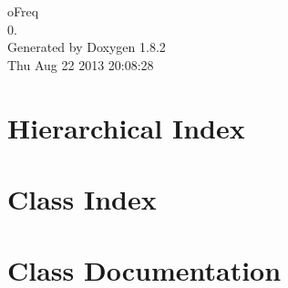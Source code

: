 \documentclass{book}
\begin{document}
\hypersetup{pageanchor=false,citecolor=blue}
\begin{titlepage}
\vspace*{7cm}
\begin{center}
{\Large o\-Freq \\[1ex]\large 0. }\\
\vspace*{1cm}
{\large Generated by Doxygen 1.8.2}\\
\vspace*{0.5cm}
{\small Thu Aug 22 2013 20:08:28}\\
\end{center}
\end{titlepage}
\clearemptydoublepage
{}
\tableofcontents
\clearemptydoublepage
{}
\hypersetup{pageanchor=true,citecolor=blue}
\chapter{Hierarchical Index}

\chapter{Class Index}

\chapter{Class Documentation}




































\printindex
\end{document}
